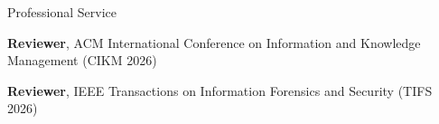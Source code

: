 \begin{rubric}{Professional Service}

\entry*[2026]
    \textbf{Reviewer}, ACM International Conference on Information and Knowledge Management (CIKM 2026)

\entry*[2026]
    \textbf{Reviewer}, IEEE Transactions on Information Forensics and Security (TIFS 2026)

\end{rubric}
